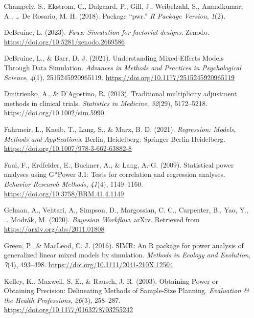 \documentclass[
  man,floatsintext]{apa6}
\newlength{\cslhangindent}
\newlength{\cslentryspacingunit} %
\newenvironment{CSLReferences}[2] %
 {%
  \setlength{\parindent}{0pt}
  \ifodd #1
  \let\oldpar\par
  \def\par{\hangindent=\cslhangindent\oldpar}
  \fi
  \setlength{\parskip}{#2\cslentryspacingunit}
 }%
 {}
\begin{document}
\begin{CSLReferences}{1}{0}
\leavevmode{}%
Champely, S., Ekstrom, C., Dalgaard, P., Gill, J., Weibelzahl, S., Anandkumar, A., \ldots{} De Rosario, M. H. (2018). Package {``pwr.''} \emph{R Package Version}, \emph{1}(2).

\leavevmode{}%
DeBruine, L. (2023). \emph{Faux: Simulation for factorial designs}. Zenodo. \url{https://doi.org/10.5281/zenodo.2669586}

\leavevmode{}%
DeBruine, L., \& Barr, D. J. (2021). Understanding {Mixed-Effects Models Through Data Simulation}. \emph{Advances in Methods and Practices in Psychological Science}, \emph{4}(1), 2515245920965119. \url{https://doi.org/10.1177/2515245920965119}

\leavevmode{}%
Dmitrienko, A., \& D'Agostino, R. (2013). Traditional multiplicity adjustment methods in clinical trials. \emph{Statistics in Medicine}, \emph{32}(29), 5172--5218. \url{https://doi.org/10.1002/sim.5990}

\leavevmode{}%
Fahrmeir, L., Kneib, T., Lang, S., \& Marx, B. D. (2021). \emph{Regression: {Models}, {Methods} and {Applications}}. Berlin, Heidelberg: Springer Berlin Heidelberg. \url{https://doi.org/10.1007/978-3-662-63882-8}

\leavevmode{}%
Faul, F., Erdfelder, E., Buchner, A., \& Lang, A.-G. (2009). Statistical power analyses using {G}*{Power} 3.1: {Tests} for correlation and regression analyses. \emph{Behavior Research Methods}, \emph{41}(4), 1149--1160. \url{https://doi.org/10.3758/BRM.41.4.1149}

\leavevmode{}%
Gelman, A., Vehtari, A., Simpson, D., Margossian, C. C., Carpenter, B., Yao, Y., \ldots{} Modrák, M. (2020). \emph{Bayesian {Workflow}}. arXiv. Retrieved from \url{https://arxiv.org/abs/2011.01808}

\leavevmode{}%
Green, P., \& MacLeod, C. J. (2016). {SIMR}: An {R} package for power analysis of generalized linear mixed models by simulation. \emph{Methods in Ecology and Evolution}, \emph{7}(4), 493--498. \url{https://doi.org/10.1111/2041-210X.12504}

\leavevmode{}%
Kelley, K., Maxwell, S. E., \& Rausch, J. R. (2003). Obtaining {Power} or {Obtaining Precision}: {Delineating Methods} of {Sample-Size Planning}. \emph{Evaluation \& the Health Professions}, \emph{26}(3), 258--287. \url{https://doi.org/10.1177/0163278703255242}


\end{CSLReferences}
\end{document}
